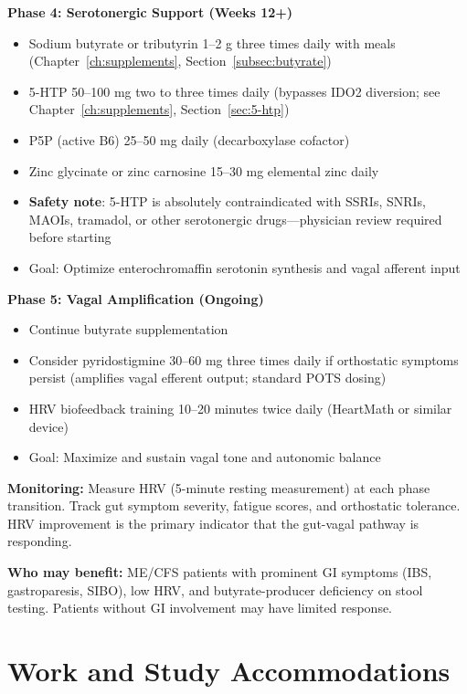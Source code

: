 \begin{speculation}
\textbf{Phase 4: Serotonergic Support (Weeks 12+)}
\begin{itemize}
    \item Sodium butyrate or tributyrin 1--2 g three times daily with meals (Chapter~\ref{ch:supplements}, Section~\ref{subsec:butyrate})
    \item 5-HTP 50--100 mg two to three times daily (bypasses IDO2 diversion; see Chapter~\ref{ch:supplements}, Section~\ref{sec:5-htp})
    \item P5P (active B6) 25--50 mg daily (decarboxylase cofactor)
    \item Zinc glycinate or zinc carnosine 15--30 mg elemental zinc daily
    \item \textbf{Safety note}: 5-HTP is absolutely contraindicated with SSRIs, SNRIs, MAOIs, tramadol, or other serotonergic drugs---physician review required before starting
    \item Goal: Optimize enterochromaffin serotonin synthesis and vagal afferent input
\end{itemize}

\textbf{Phase 5: Vagal Amplification (Ongoing)}
\begin{itemize}
    \item Continue butyrate supplementation
    \item Consider pyridostigmine 30--60 mg three times daily if orthostatic symptoms persist (amplifies vagal efferent output; standard POTS dosing)
    \item HRV biofeedback training 10--20 minutes twice daily (HeartMath or similar device)
    \item Goal: Maximize and sustain vagal tone and autonomic balance
\end{itemize}

\textbf{Monitoring:} Measure HRV (5-minute resting measurement) at each phase transition. Track gut symptom severity, fatigue scores, and orthostatic tolerance. HRV improvement is the primary indicator that the gut-vagal pathway is responding.

\textbf{Who may benefit:} ME/CFS patients with prominent GI symptoms (IBS, gastroparesis, SIBO), low HRV, and butyrate-producer deficiency on stool testing. Patients without GI involvement may have limited response.
\end{speculation}

\section{Work and Study Accommodations}
\label{sec:work-study}

